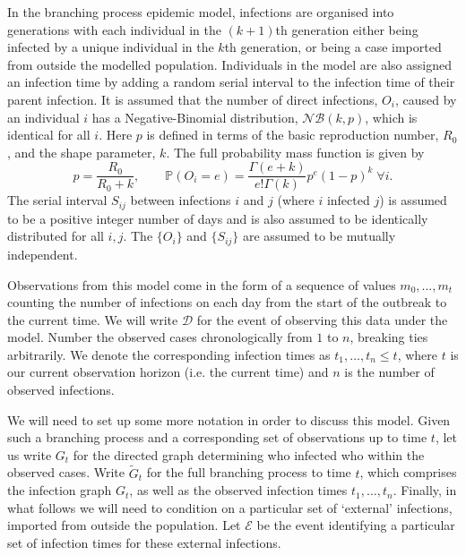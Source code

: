 \documentclass{article}
\begin{document}
In the branching process epidemic model, infections are organised into generations with each individual in the \((k+1)\)th generation either being infected by a unique individual in the \(k\)th generation, or being a case imported from outside the modelled population. Individuals in the model are also assigned an infection time by adding a random serial interval to the infection time of their parent infection. It is assumed that the number of direct infections, \(O_i\), caused by an individual \(i\) has a Negative-Binomial distribution, \(\mathcal{NB}(k, p)\), which is identical for all \(i\). Here \(p\) is defined in terms of the basic reproduction number, \(R_0\), and the shape parameter, \(k\). The full probability mass function is given by
\[p = \frac{R_0}{R_0 + k}, \qquad \mathbb{P}(O_i = e) = \frac{\Gamma(e + k)}{e! \Gamma(k)} p^e (1-p)^k \; \forall i.\]
The serial interval \(S_{ij}\) between infections \(i\) and \(j\) (where \(i\) infected \(j\)) is assumed to be a positive integer number of days and is also assumed to be identically distributed for all \(i, j\). The \(\{O_i\}\) and \(\{S_{ij}\}\) are assumed to be mutually independent.

Observations from this model come in the form of a sequence of values \(m_0, \dots, m_t\) counting the number of infections on each day from the start of the outbreak to the current time. We will write \(\mathcal{D}\) for the event of observing this data under the model. Number the observed cases chronologically from \(1\) to \(n\), breaking ties arbitrarily. We denote the corresponding infection times as \(t_1, \dots, t_n \leq t\), where \(t\) is our current observation horizon (i.e. the current time) and \(n\) is the number of observed infections.

We will need to set up some more notation in order to discuss this model. Given such a branching process and a corresponding set of observations up to time \(t\), let us write \(G_t\) for the directed graph determining who infected who within the observed cases. Write \(\tilde{G}_t\) for the full branching process to time \(t\), which comprises the infection graph \(G_t\), as well as the observed infection times \(t_1, \dots, t_n\).
Finally, in what follows we will need to condition on a particular set of `external' infections, imported from outside the population. Let \(\mathcal{E}\) be the event identifying a particular set of infection times for these external infections.
\end{document}
